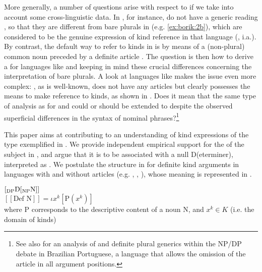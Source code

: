 \documentclass[output=paper
,modfonts
,nonflat]{langsci/langscibook}
\begin{document}
	More generally, a number of questions arise with respect to  if we take into account some cross-linguistic data. In , for instance,  do not have a generic reading \citep{Laca1990,Dobrovie-Sorin1996, Dobrovie-Sorin2003}, so that they are different from bare plurals in  (e.g. \ref{ex:borik:2b}), which are considered to be the genuine expression of kind reference in that language (\citealt{Longobardi1994, Longobardi2001, Longobardi2005,Chierchia1998,Dayal2004}, i.a.). By contrast, the default way to refer to kinds in  is by means of a (non-plural) common noun preceded by a definite article \citep{Borik2015}. The question is then how to derive a  for languages like  and  keeping in mind these crucial differences concerning the interpretation of bare plurals. A look at languages like  makes the issue even more complex: , as is well-known, does not have any articles but clearly possesses the means to make reference to kinds, as shown in . Does it mean that the same type of analysis as for  and  could or should be extended to  despite the observed superficial differences in the syntax of nominal phrases?\footnote{See also \citet{Cyrino2015} for an analysis of  and definite plural generics within the NP/DP debate in Brazilian Portuguese, a language that allows the omission of the article in all argument positions.}
	
	This paper aims at contributing to an understanding of kind expressions of the type exemplified in . We provide independent empirical support for the  of the subject in , and argue that it is to be associated with a null D(eterminer), interpreted as . We postulate the structure in  for definite kind arguments in languages with and without articles (e.g. , , ), whose meaning is represented in . 
	
	\ea\label{ex:borik:3}
	\ea\label{ex:borik:3a}
	$[_{\mbox{\scriptsize DP}} \mbox{D} [_{\mbox{\scriptsize NP}} \mbox{N}]]$\\
	\ex\label{ex:borik:3b}
	$[\![ \mbox{Def N} ]\!] = \iota x^k [\mbox{P}(x^k)]$\\
	where P corresponds to the descriptive content of a noun N, and $x^k \in K$ (i.e. the domain of kinds)
	\z
	\z
	
\end{document}
